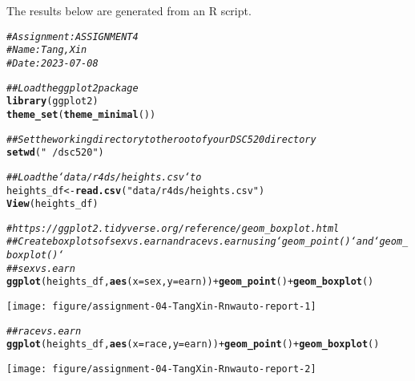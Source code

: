 \documentclass{article}\usepackage[]{graphicx}\usepackage[]{xcolor}
\makeatletter
\newcommand{\hlstr}[1]{\textcolor[rgb]{0.192,0.494,0.8}{#1}}%
\newcommand{\hlcom}[1]{\textcolor[rgb]{0.678,0.584,0.686}{\textit{#1}}}%
\newcommand{\hlopt}[1]{\textcolor[rgb]{0,0,0}{#1}}%
\newcommand{\hlstd}[1]{\textcolor[rgb]{0.345,0.345,0.345}{#1}}%
\newcommand{\hlkwb}[1]{\textcolor[rgb]{0.69,0.353,0.396}{#1}}%
\newcommand{\hlkwc}[1]{\textcolor[rgb]{0.333,0.667,0.333}{#1}}%
\newcommand{\hlkwd}[1]{\textcolor[rgb]{0.737,0.353,0.396}{\textbf{#1}}}%
\newenvironment{kframe}{%
 \def\at@end@of@kframe{}%
 \ifinner\ifhmode%
  \def\at@end@of@kframe{\end{minipage}}%
  \begin{minipage}{\columnwidth}%
 \fi\fi%
 \def\FrameCommand##1{\hskip\@totalleftmargin \hskip-\fboxsep
 \colorbox{shadecolor}{##1}\hskip-\fboxsep
     \hskip-\linewidth \hskip-\@totalleftmargin \hskip\columnwidth}%
 \MakeFramed {\advance\hsize-\width
   \@totalleftmargin\z@ \linewidth\hsize
   \@setminipage}}%
 {\par\unskip\endMakeFramed%
 \at@end@of@kframe}
\newenvironment{knitrout}{}{} %
\makeatother
\begin{document}
\title{}



\maketitle
The results below are generated from an R script.

\begin{knitrout}
\color{fgcolor}\begin{kframe}
\begin{alltt}
\hlcom{# Assignment: ASSIGNMENT 4}
\hlcom{# Name: Tang, Xin}
\hlcom{# Date: 2023-07-08}

\hlcom{## Load the ggplot2 package}
\hlkwd{library}\hlstd{(ggplot2)}
\hlkwd{theme_set}\hlstd{(}\hlkwd{theme_minimal}\hlstd{())}

\hlcom{## Set the working directory to the root of your DSC 520 directory}
\hlkwd{setwd}\hlstd{(}\hlstr{"~/dsc520"}\hlstd{)}

\hlcom{## Load the `data/r4ds/heights.csv` to}
\hlstd{heights_df} \hlkwb{<-} \hlkwd{read.csv}\hlstd{(}\hlstr{"data/r4ds/heights.csv"}\hlstd{)}
\hlkwd{View}\hlstd{(heights_df)}

\hlcom{# https://ggplot2.tidyverse.org/reference/geom_boxplot.html}
\hlcom{## Create boxplots of sex vs. earn and race vs. earn using `geom_point()` and `geom_boxplot()`}
\hlcom{## sex vs. earn}
\hlkwd{ggplot}\hlstd{(heights_df,} \hlkwd{aes}\hlstd{(}\hlkwc{x}\hlstd{=sex,} \hlkwc{y}\hlstd{=earn))} \hlopt{+} \hlkwd{geom_point}\hlstd{()} \hlopt{+}\hlkwd{geom_boxplot}\hlstd{()}
\end{alltt}
\end{kframe}

{\centering \texttt{[image: figure/assignment-04-TangXin-Rnwauto-report-1]} 

}


\begin{kframe}\begin{alltt}
\hlcom{## race vs. earn}
\hlkwd{ggplot}\hlstd{(heights_df,} \hlkwd{aes}\hlstd{(}\hlkwc{x}\hlstd{=race,} \hlkwc{y}\hlstd{=earn))} \hlopt{+} \hlkwd{geom_point}\hlstd{()}\hlopt{+} \hlkwd{geom_boxplot}\hlstd{()}
\end{alltt}
\end{kframe}

{\centering \texttt{[image: figure/assignment-04-TangXin-Rnwauto-report-2]} 

}



\end{knitrout}
\end{document}
